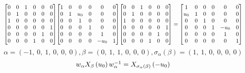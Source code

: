 \documentclass[11pt]{article}
\theoremstyle{definition}
\begin{document}
\[
\scaletoalign{\textwidth}{{\left[\begin{matrix}0 & 0 & 1 & 0 & 0 & 0\\0 & 1 & 0 & 0 & 0 & 0\\1 & 0 & 0 & 0 & 0 & 0\\0 & 0 & 0 & 0 & 0 & 1\\0 & 0 & 0 & 0 & 1 & 0\\0 & 0 & 0 & 1 & 0 & 0\end{matrix}\right]} {\left[\begin{matrix}1 & 0 & 0 & 0 & 0 & 0\\0 & 1 & u_{0} & 0 & 0 & 0\\0 & 0 & 1 & 0 & 0 & 0\\0 & 0 & 0 & 1 & 0 & 0\\0 & 0 & 0 & 0 & 1 & 0\\0 & 0 & 0 & 0 & - u_{0} & 1\end{matrix}\right]} {\left[\begin{matrix}0 & 0 & 1 & 0 & 0 & 0\\0 & 1 & 0 & 0 & 0 & 0\\1 & 0 & 0 & 0 & 0 & 0\\0 & 0 & 0 & 0 & 0 & 1\\0 & 0 & 0 & 0 & 1 & 0\\0 & 0 & 0 & 1 & 0 & 0\end{matrix}\right]} = {\left[\begin{matrix}1 & 0 & 0 & 0 & 0 & 0\\u_{0} & 1 & 0 & 0 & 0 & 0\\0 & 0 & 1 & 0 & 0 & 0\\0 & 0 & 0 & 1 & - u_{0} & 0\\0 & 0 & 0 & 0 & 1 & 0\\0 & 0 & 0 & 0 & 0 & 1\end{matrix}\right]}}
\]
\[
\alpha = \left( -1, \  0, \  1, \  0, \  0, \  0\right), \beta = \left( 0, \  1, \  1, \  0, \  0, \  0\right), \sigma_{\alpha}(\beta) = \left( 1, \  1, \  0, \  0, \  0, \  0\right)
\]
\[
\scaletoalign{\textwidth}{w_{\alpha} X_{\beta}\left(u_{0}\right) w_{\alpha}^{-1} = X_{\sigma_{\alpha}\left(\beta\right)}\left(- u_{0}\right)}
\]
\end{document}

